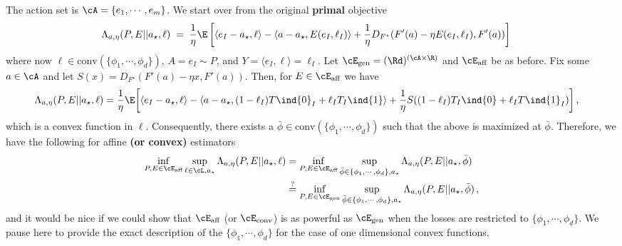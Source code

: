 The action set is $\cA = \{e_1, \cdots, e_m\}$.
We start over from the original \textbf{primal} objective
\begin{align*}
    \Lambda_{a, \eta}(P, E || a_\star, \ell)
     & \;=\;
    \frac{1}{\eta}
    \E\left[
        \langle e_I - a_\star, \ell\rangle
        - \langle a - a_\star, E(e_I, \ell_I)\rangle
        + \frac{1}{\eta} D_{F^\star}(F'(a) - \eta E(e_I, \ell_I), F'(a))
        \right]\,
\end{align*}
where now $\ell \in \text{conv}(\{\phi_1, \cdots, \phi_d\})$, $A = e_I \sim P$, and $Y = \langle e_I, \ell \rangle = \ell_I$.
Let $\cE_{\text{gen}} = (\Rd)^{(\cA \times \R)}$ and $\cE_{\text{aff}}$ be as before.
Fix some $a \in \cA$ and let $S(x) = D_{F^\star}(F'(a) - \eta x, F'(a))$.
Then, for $E \in \cE_{\text{aff}}$ we have
\begin{align*}
    \Lambda_{a, \eta}(P, E || a_\star, \ell)
     & =
    \frac{1}{\eta}
    \E\bigg[
        \langle e_I - a_\star, \ell\rangle
        - \langle a - a_\star, (1-\ell_I)T\ind{0}_I + \ell_I T_I\ind{1}\rangle
        + \frac{1}{\eta} S((1 - \ell_I)T_I\ind{0} + \ell_I T\ind{1}_I)
        \bigg]\,,
\end{align*}
which is a convex function in $\ell$.
Consequently, there exists a $\bar{\phi} \in \text{conv}(\{\phi_1, \cdots, \phi_d\})$
such that the above is maximized at $\bar{\phi}$.
Therefore, we have the following for affine \textbf{(or convex)} estimators
\begin{align*}
    \inf_{P, E \in \cE_{\text{aff}}}
    \sup_{\ell \in \cL, a_\star}
    \Lambda_{a, \eta}(P, E || a_\star, \ell)
     & =
    \inf_{P, E \in \cE_{\text{aff}}}
    \sup_{\bar{\phi} \in \{\phi_1, \cdots, \phi_d\}, a_\star}
    \Lambda_{a, \eta}(P, E || a_\star, \bar{\phi}) \\
     & \stackrel{?}{=}
    \inf_{P, E \in \cE_{\text{gen}}}
    \sup_{\bar{\phi} \in \{\phi_1, \cdots, \phi_d\}, a_\star}
    \Lambda_{a, \eta}(P, E || a_\star, \bar{\phi})\,,
\end{align*}
and it would be nice if we could show that $\cE_{\text{aff}}$ (or $\cE_{\text{conv}}$)
is as powerful as $\cE_{\text{gen}}$ when the losses are restricted to
$\{\phi_1, \cdots, \phi_d\}$.
We pause here to provide the exact description of the $\{\phi_1, \cdots, \phi_d\}$
for the case of one dimensional convex functions.

